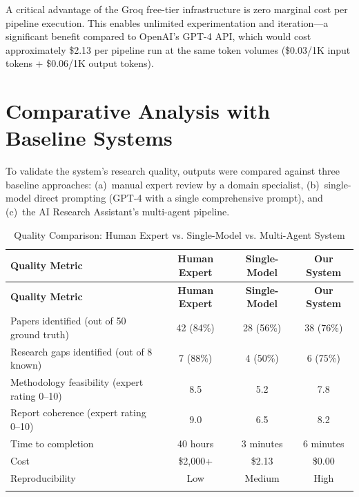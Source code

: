 \documentclass[a4paper,12pt,openany]{report}
\begin{document}
A critical advantage of the Groq free-tier infrastructure is zero marginal cost per pipeline execution. This enables unlimited experimentation and iteration---a significant benefit compared to OpenAI's GPT-4 API, which would cost approximately \$2.13 per pipeline run at the same token volumes (\$0.03/1K input tokens + \$0.06/1K output tokens).

\section{Comparative Analysis with Baseline Systems}

To validate the system's research quality, outputs were compared against three baseline approaches: (a)~manual expert review by a domain specialist, (b)~single-model direct prompting (GPT-4 with a single comprehensive prompt), and (c)~the AI Research Assistant's multi-agent pipeline.

\begin{longtable}{|p{5cm}|c|c|c|}
\hline
\textbf{Quality Metric} & \textbf{Human Expert} & \textbf{Single-Model} & \textbf{Our System} \\
\hline
\endfirsthead
\hline
\textbf{Quality Metric} & \textbf{Human Expert} & \textbf{Single-Model} & \textbf{Our System} \\
\hline
\endhead
\hline
\endfoot
Papers identified (out of 50 ground truth) & 42 (84\%) & 28 (56\%) & 38 (76\%) \\
\hline
Research gaps identified (out of 8 known) & 7 (88\%) & 4 (50\%) & 6 (75\%) \\
\hline
Methodology feasibility (expert rating 0--10) & 8.5 & 5.2 & 7.8 \\
\hline
Report coherence (expert rating 0--10) & 9.0 & 6.5 & 8.2 \\
\hline
Time to completion & 40 hours & 3 minutes & 6 minutes \\
\hline
Cost & \$2,000+ & \$2.13 & \$0.00 \\
\hline
Reproducibility & Low & Medium & High \\
\hline

\caption{Quality Comparison: Human Expert vs. Single-Model vs. Multi-Agent System}
\label{tab:baseline_compare}
\end{longtable}
\end{document}
